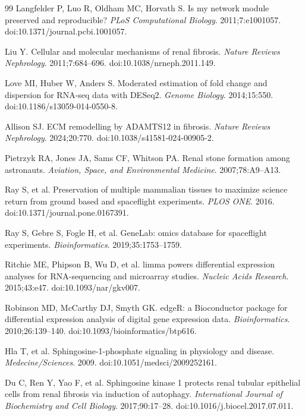 \documentclass[11pt]{article}
\begin{document}
\begin{thebibliography}{99}
 Langfelder P, Luo R, Oldham MC, Horvath S. Is my network module preserved and reproducible? \emph{PLoS Computational Biology}. 2011;7:e1001057. doi:10.1371/journal.pcbi.1001057.

 Liu Y. Cellular and molecular mechanisms of renal fibrosis. \emph{Nature Reviews Nephrology}. 2011;7:684--696. doi:10.1038/nrneph.2011.149.

 Love MI, Huber W, Anders S. Moderated estimation of fold change and dispersion for RNA-seq data with DESeq2. \emph{Genome Biology}. 2014;15:550. doi:10.1186/s13059-014-0550-8.

 Allison SJ. ECM remodelling by ADAMTS12 in fibrosis. \emph{Nature Reviews Nephrology}. 2024;20:770. doi:10.1038/s41581-024-00905-2.

 Pietrzyk RA, Jones JA, Sams CF, Whitson PA. Renal stone formation among astronauts. \emph{Aviation, Space, and Environmental Medicine}. 2007;78:A9--A13.

 Ray S, et al. Preservation of multiple mammalian tissues to maximize science return from ground based and spaceflight experiments. \emph{PLOS ONE}. 2016. doi:10.1371/journal.pone.0167391.

 Ray S, Gebre S, Fogle H, et al. GeneLab: omics database for spaceflight experiments. \emph{Bioinformatics}. 2019;35:1753--1759.

 Ritchie ME, Phipson B, Wu D, et al. limma powers differential expression analyses for RNA-sequencing and microarray studies. \emph{Nucleic Acids Research}. 2015;43:e47. doi:10.1093/nar/gkv007.

 Robinson MD, McCarthy DJ, Smyth GK. edgeR: a Bioconductor package for differential expression analysis of digital gene expression data. \emph{Bioinformatics}. 2010;26:139--140. doi:10.1093/bioinformatics/btp616.

 Hla T, et al. Sphingosine-1-phosphate signaling in physiology and disease. \emph{Medecine/Sciences}. 2009. doi:10.1051/medsci/2009252161.

 Du C, Ren Y, Yao F, et al. Sphingosine kinase 1 protects renal tubular epithelial cells from renal fibrosis via induction of autophagy. \emph{International Journal of Biochemistry and Cell Biology}. 2017;90:17--28. doi:10.1016/j.biocel.2017.07.011.


\end{thebibliography}
\end{document}
